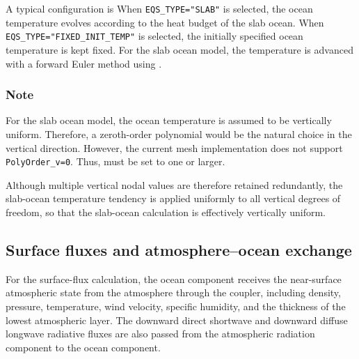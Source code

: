 A typical configuration is
When \verb|EQS_TYPE="SLAB"| is selected, the ocean temperature evolves according to the heat budget of the slab ocean.
When \verb|EQS_TYPE="FIXED_INIT_TEMP"| is selected, the initially specified ocean temperature is kept fixed.
For the slab ocean model, the temperature is advanced with a forward Euler method using . 


\subsubsection{Note}
For the slab ocean model, the ocean temperature is assumed to be vertically uniform.
Therefore, a zeroth-order polynomial would be the natural choice in the vertical direction.
However, the current mesh implementation does not support \verb|PolyOrder_v=0|.
Thus,  must be set to one or larger.

Although multiple vertical nodal values are therefore retained redundantly, 
the slab-ocean temperature tendency is applied uniformly to all vertical degrees of freedom, so that the slab-ocean calculation is effectively vertically uniform.

\subsection{Surface fluxes and atmosphere--ocean exchange}
\label{subsec:ocean_surface_flux}


For the surface-flux calculation, the ocean component receives the near-surface atmospheric state from the atmosphere through the coupler,
including density, pressure, temperature, wind velocity, specific humidity, and the thickness of the lowest atmospheric layer.
The downward direct shortwave and downward diffuse longwave radiative fluxes are also passed from the atmospheric radiation component to the ocean component.


